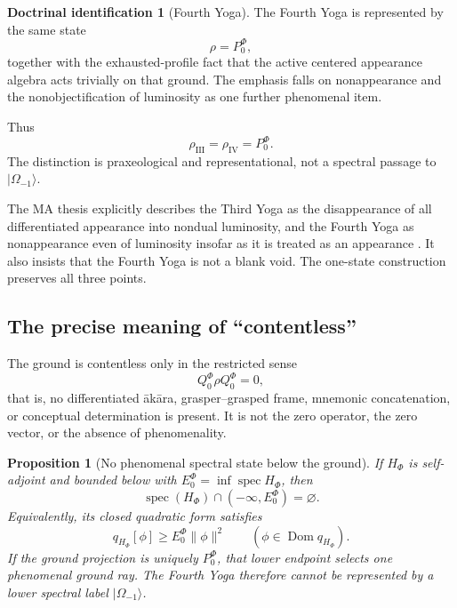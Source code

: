 \documentclass[11pt,reqno]{scrartcl}
\newcommand{\PzeroF}{P_{0}^{\Phi}}
\newcommand{\QzeroF}{Q_{0}^{\Phi}}
\newcommand{\ket}[1]{\lvert #1\rangle}
\DeclareMathOperator{\Dom}{Dom}
\DeclareMathOperator{\spec}{spec}
\theoremstyle{plain}
\newtheorem{proposition}[proposition]{Proposition}
\theoremstyle{definition}
\newtheorem{identification}[identification]{Doctrinal identification}
\theoremstyle{remark}
\begin{document}
\begin{identification}[Fourth Yoga]
\label{id:fourth-yoga}
The Fourth Yoga is represented by the same state
\begin{equation}
  \rho=\PzeroF,
  \label{eq:fourth-yoga-same-state}
\end{equation}
together with the exhausted-profile fact that the active centered appearance
algebra acts trivially on that ground.  The emphasis falls on nonappearance
and the nonobjectification of luminosity as one further phenomenal item.
\end{identification}

Thus
\begin{equation}
  \boxed{
  \rho_{\mathrm{III}}
  =\rho_{\mathrm{IV}}
  =\PzeroF.}
  \label{eq:third-fourth-identical-density}
\end{equation}
The distinction is praxeological and representational, not a spectral passage
to $\ket{\Omega_{-1}}$.

The MA thesis explicitly describes the Third Yoga as the disappearance of all
differentiated appearance into nondual luminosity, and the Fourth Yoga as
nonappearance even of luminosity insofar as it is treated as an appearance
\cite[pp.~182--185]{Yiannopoulos2012}.  It also insists that the Fourth Yoga
is not a blank void.  The one-state construction preserves all three points.

\subsection{The precise meaning of ``contentless''}

The ground is contentless only in the restricted sense
\begin{equation}
  \QzeroF\rho\QzeroF=0,
  \label{eq:no-differentiated-content-ground}
\end{equation}
that is, no differentiated \=ak\=ara, grasper--grasped frame, mnemonic
concatenation, or conceptual determination is present.  It is not the zero
operator, the zero vector, or the absence of phenomenality.

\begin{proposition}[No phenomenal spectral state below the ground]
\label{prop:no-state-below-ground}
If $H_{\Phi}$ is self-adjoint and bounded below with
$E_0^{\Phi}=\inf\spec H_{\Phi}$, then
\begin{equation}
  \spec(H_{\Phi})\cap(-\infty,E_0^{\Phi})=\varnothing.
  \label{eq:no-spectrum-below-ground}
\end{equation}
Equivalently, its closed quadratic form satisfies
\begin{equation}
  q_{H_{\Phi}}[\phi]
  \geq E_0^{\Phi}\|\phi\|^2
  \qquad
  (\phi\in\Dom q_{H_{\Phi}}).
  \label{eq:ground-form-lower-bound}
\end{equation}
If the ground projection is uniquely $\PzeroF$, that lower endpoint selects
one phenomenal ground ray.  The Fourth Yoga therefore cannot be represented
by a lower spectral label $\ket{\Omega_{-1}}$.
\end{proposition}
\end{document}
